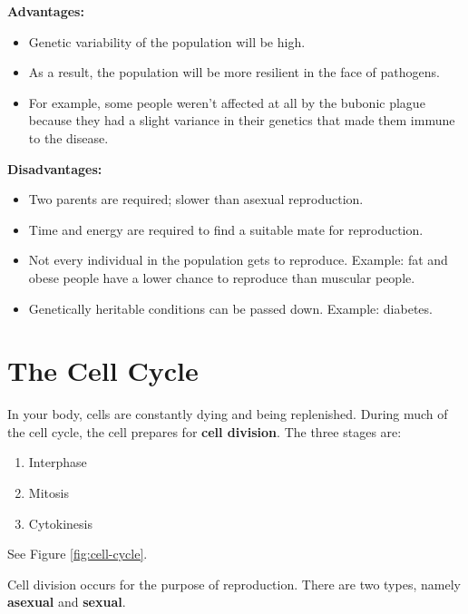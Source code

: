 \documentclass[12pt]{report}
\begin{document}
\textbf{Advantages:}
\begin{itemize}
    \item{Genetic variability of the population will be high.}
    \item{As a result, the population will be more resilient in the face of pathogens.}
    \item{For example, some people weren't affected at all by the bubonic plague because they had a slight variance in their genetics that made them immune to the disease.}
\end{itemize}

\textbf{Disadvantages:}
\begin{itemize}
    \item{Two parents are required; slower than asexual reproduction.}
    \item{Time and energy are required to find a suitable mate for reproduction.}
    \item{Not every individual in the population gets to reproduce. Example: fat and obese people have a lower chance to reproduce than muscular people.}
    \item{Genetically heritable conditions can be passed down. Example: diabetes.}
\end{itemize}



\section{The Cell Cycle}
\begin{definition}
In your body, cells are constantly dying and being replenished. During much of the cell cycle, the cell prepares for \textbf{cell division}. The three stages are: 
\begin{enumerate}
\setlength\itemsep{0.5em}
    \item{Interphase}
    \item{Mitosis}
    \item{Cytokinesis}
\end{enumerate}
See Figure \ref{fig:cell-cycle}.
\end{definition}

Cell division occurs for the purpose of reproduction. There are two types, namely \textbf{asexual} and \textbf{sexual}.
\end{document}
